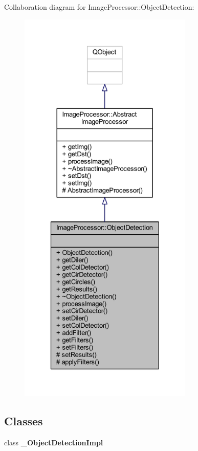 Collaboration diagram for Image\+Processor\+:\+:Object\+Detection\+:\nopagebreak
\begin{figure}[H]
\begin{center}
\leavevmode
\includegraphics[height=550pt]{d8/daa/class_image_processor_1_1_object_detection__coll__graph}
\end{center}
\end{figure}
\subsection*{Classes}
\begin{DoxyCompactItemize}
\item 
class {\bfseries \+\_\+\+Object\+Detection\+Impl}
\end{DoxyCompactItemize}
